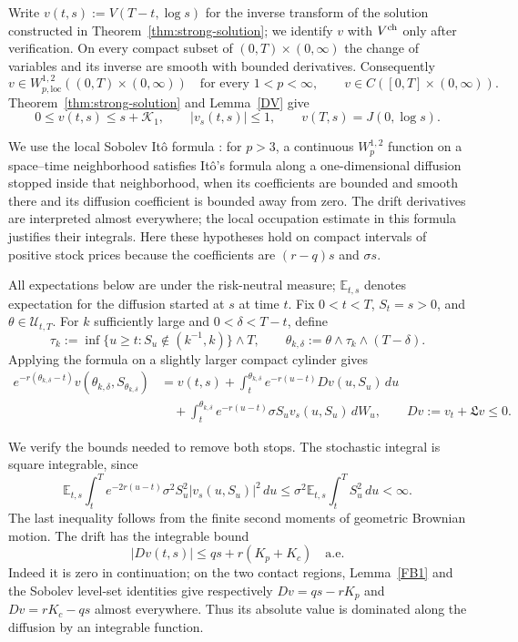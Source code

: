 \documentclass[11pt, a4paper, leqno]{amsart}
\numberwithin{equation}{section}
\theoremstyle{plain}
\theoremstyle{definition}
\theoremstyle{remark}
\def\leq{\leqslant}
\def\geq{\geqslant}
\begin{document}
{
Write $v(t,s):=V(T-t,\log s)$ for the inverse transform of the
solution constructed in Theorem~\ref{thm:strong-solution}; we identify
$v$ with $V^{\rm ch}$ only after verification. On every compact
subset of $(0,T)\times(0,\infty)$ the change of variables and its
inverse are smooth with bounded derivatives. Consequently
\[
 v\in W^{1,2}_{p,\mathrm{loc}}((0,T)\times(0,\infty))
 \quad\text{for every }1<p<\infty,
 \qquad
 v\in C([0,T]\times(0,\infty)).
\]
Theorem~\ref{thm:strong-solution} and Lemma~\ref{DV} give
\[
 0\leq v(t,s)\leq s+\mathcal K_1,
 \qquad |v_s(t,s)|\leq1,
 \qquad v(T,s)=J(0,\log s).
\]

We use the local Sobolev It\^o formula
\cite[Theorem~1, p.~122]{KRY80}: for $p>3$, a continuous
$W^{1,2}_p$ function on a space--time neighborhood satisfies
It\^o's formula along a one-dimensional diffusion stopped inside
that neighborhood, when its coefficients are bounded and smooth
there and its diffusion coefficient is bounded away from zero.
The drift derivatives are interpreted almost everywhere; the local
occupation estimate in this formula justifies their integrals.
Here these hypotheses hold on compact intervals of positive stock
prices because the coefficients are $(r-q)s$ and $\sigma s$.

All expectations below are under the risk-neutral measure;
$\mathbb E_{t,s}$ denotes expectation for the diffusion started at $s$
at time $t$. Fix $0<t<T$, $S_t=s>0$, and
$\theta\in\mathcal U_{t,T}$.
For $k$ sufficiently large and $0<\delta<T-t$, define
\[
 \tau_k:=\inf\{u\geq t:S_u\notin(k^{-1},k)\}\wedge T,
 \qquad \theta_{k,\delta}:=\theta\wedge\tau_k\wedge(T-\delta).
\]
Applying the formula on a slightly larger compact cylinder gives
\begin{equation}\label{V:Ito verification}
\begin{aligned}
 e^{-r(\theta_{k,\delta}-t)}
 v(\theta_{k,\delta},S_{\theta_{k,\delta}})
 &=v(t,s)+\int_t^{\theta_{k,\delta}}
       e^{-r(u-t)}D v(u,S_u)\,du\\
 &\quad+\int_t^{\theta_{k,\delta}}
       e^{-r(u-t)}\sigma S_uv_s(u,S_u)\,dW_u,
 \qquad Dv:=v_t+\mathfrak L v\leq0.
\end{aligned}
\end{equation}

We verify the bounds needed to remove both stops. The stochastic
integral is square integrable, since
\begin{equation}\label{Condition:L2}
 \mathbb E_{t,s}\int_t^T
    e^{-2r(u-t)}\sigma^2S_u^2|v_s(u,S_u)|^2\,du
 \leq\sigma^2\mathbb E_{t,s}\int_t^T S_u^2\,du<\infty.
\end{equation}
The last inequality follows from the finite second moments of
geometric Brownian motion. The drift has the integrable bound
\[
 |Dv(t,s)|\leq qs+r(K_p+K_c)\quad\text{a.e.}
\]
Indeed it is zero in continuation; on the two contact regions,
Lemma~\ref{FB1} and the Sobolev level-set identities give respectively
$Dv=qs-rK_p$ and $Dv=rK_c-qs$ almost everywhere. Thus its absolute
value is dominated along the diffusion by an integrable function.

}
\end{document}
